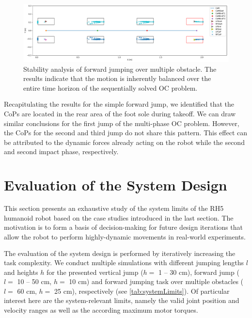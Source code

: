 \begin{figure}[h!]
\centering	
\includegraphics[width=1\textwidth]{fig/jumpObstacles/StabilityAnalysis}
\caption[Stability analysis of forward jumping over multiple obstacle]{Stability analysis of forward jumping over multiple obstacle. The results indicate that the motion is inherently balanced over the entire time horizon of the sequentially solved \gls{OC} problem.}
\label{fig:jumpObstacles_StabilityAnalysis}
\end{figure}

Recapitulating the results for the simple forward jump, we identified that the \gls{CoP}s are located in the rear area of the foot sole during takeoff. We can draw similar conclusions for the first jump of the multi-phase \gls{OC} problem. However, the \gls{CoP}s for the second and third jump do not share this pattern. This effect can be attributed to the dynamic forces already acting on the robot while the second and second impact phase, respectively.


\section{Evaluation of the System Design}\label{sec:HighlyEvaluation}

This section presents an exhaustive study of the system limits of the RH5 humanoid robot based on the case studies introduced in the last section. The motivation is to form a basis of decision-making for future design iterations that allow the robot to perform highly-dynamic movements in real-world experiments.

The evaluation of the system design is performed by iteratively increasing the task complexity. We conduct multiple simulations with different jumping lengths $l$ and heights $h$ for the presented vertical jump ($h=$ 1 -- 30 cm), forward jump ($l=$ 10 -- 50 cm, $h=$ 10 cm) and forward jumping task over multiple obstacles ($l=$ 60 cm, $h=$ 25 cm), respectively (see \cref{tab:systemLimits}). Of particular interest here are the system-relevant limits, namely the valid  joint position and velocity ranges as well as the according maximum  motor torques. 

